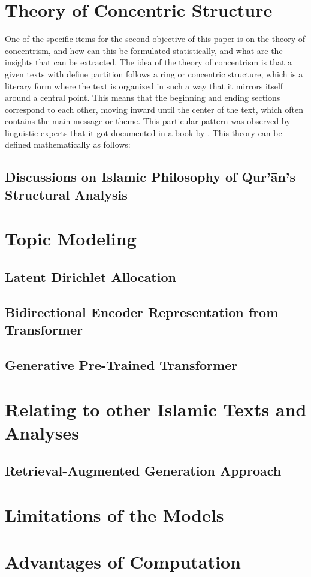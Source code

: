 \section{Theory of Concentric Structure}
One of the specific items for the second objective of this paper is on the theory of concentrism, and how can this be formulated statistically, and what are the insights that can be extracted. The idea of the theory of concentrism is that a given texts with define partition follows a ring or concentric structure, which is a literary form where the text is organized in such a way that it mirrors itself around a central point. This means that the beginning and ending sections correspond to each other, moving inward until the center of the text, which often contains the main message or theme. This particular pattern was observed by linguistic experts that it got documented in a book by . This theory can be defined mathematically as follows:

\subsection{Discussions on Islamic Philosophy of Qur'\=an's Structural Analysis}
\newpage
\section{Topic Modeling}\label{sec:ch4_topic_modeling_result}
\subsection{Latent Dirichlet Allocation}
\subsection{Bidirectional Encoder Representation from Transformer}
\subsection{Generative Pre-Trained Transformer}
\section{Relating to other Islamic Texts and Analyses}\label{sec:ch4_relating_islamic_texts}
\subsection{Retrieval-Augmented Generation Approach}
\section{Limitations of the Models}

\section{Advantages of Computation}
